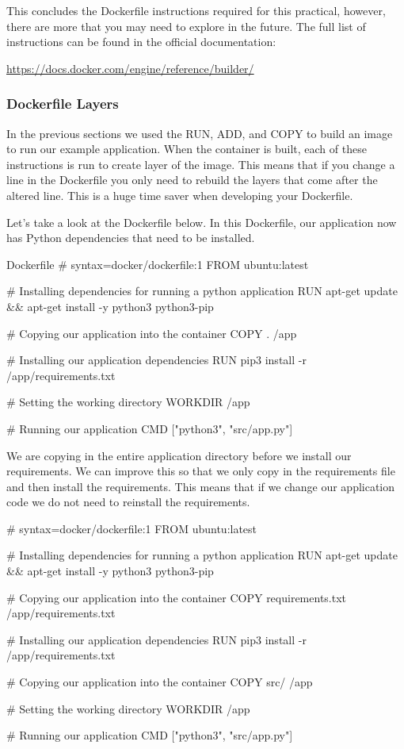 \documentclass{csse4400}
\begin{document}
This concludes the Dockerfile instructions required for this practical,
however, there are more that you may need to explore in the future.
The full list of instructions can be found in the official documentation:

\url{https://docs.docker.com/engine/reference/builder/}

\subsubsection{Dockerfile Layers}

In the previous sections we used the RUN, ADD, and COPY to build an image to run our example application.
When the container is built, each of these instructions is run to create layer of the image.
This means that if you change a line in the Dockerfile you only need to rebuild the layers that come after the altered line.
This is a huge time saver when developing your Dockerfile.

Let's take a look at the Dockerfile below.
In this Dockerfile, our application now has Python dependencies that need to be installed.

\begin{code}[language=docker,numbers=none]{Dockerfile}
# syntax=docker/dockerfile:1
FROM ubuntu:latest

# Installing dependencies for running a python application
RUN apt-get update && apt-get install -y python3 python3-pip

# Copying our application into the container
COPY . /app

# Installing our application dependencies
RUN pip3 install -r /app/requirements.txt

# Setting the working directory
WORKDIR /app

# Running our application
CMD ["python3", "src/app.py"]
\end{code}

We are copying in the entire application directory before we install our requirements.
We can improve this so that we only copy in the requirements file and then install the requirements.
This means that if we change our application code we do not need to reinstall the requirements.

\begin{code}[language=docker,numbers=none]{}
# syntax=docker/dockerfile:1
FROM ubuntu:latest

# Installing dependencies for running a python application
RUN apt-get update && apt-get install -y python3 python3-pip

# Copying our application into the container
COPY requirements.txt /app/requirements.txt

# Installing our application dependencies
RUN pip3 install -r /app/requirements.txt

# Copying our application into the container
COPY src/ /app

# Setting the working directory
WORKDIR /app

# Running our application
CMD ["python3", "src/app.py"]
\end{code}
\end{document}
